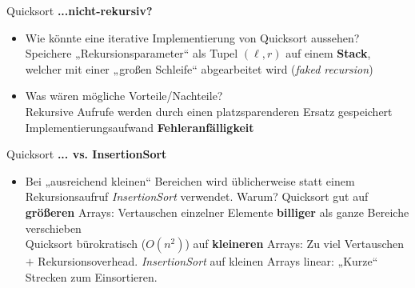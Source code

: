 \begin{frame}{Quicksort}
	\textbf{...nicht-rekursiv?} \\
	\begin{itemize}
		\item Wie könnte eine iterative Implementierung von Quicksort aussehen? \\
		\pause
		\impl Speichere „Rekursionsparameter“ als Tupel $(\ell, r)$ auf einem \textbf{Stack}, welcher mit einer „großen Schleife“ abgearbeitet wird (\emph{faked recursion})
		\item Was wären mögliche Vorteile/Nachteile? \\ 
		\pause
		\Pros Rekursive Aufrufe werden durch einen platzsparenderen Ersatz gespeichert \\
		\Cons Implementierungsaufwand \impl \textbf{Fehleranfälligkeit}
	\end{itemize}
\end{frame}

\begin{frame}{Quicksort}
	\textbf{... vs. InsertionSort} \\
	\begin{itemize}
		\item Bei „ausreichend kleinen“ Bereichen wird üblicherweise statt einem Rekursionsaufruf \emph{InsertionSort} verwendet. Warum? 
		\pause 
		\implitem \Pros Quicksort gut auf \textbf{größeren} Arrays: Vertauschen einzelner Elemente \textbf{billiger} als ganze Bereiche verschieben \\
		\Cons Quicksort bürokratisch ($O(n^2)$) auf \textbf{kleineren} Arrays: Zu viel Vertauschen $+$ Rekursionsoverhead. 
		\pause
		\implitem \emph{InsertionSort} auf kleinen Arrays linear: „Kurze“ Strecken zum Einsortieren.
	\end{itemize}
\end{frame}


